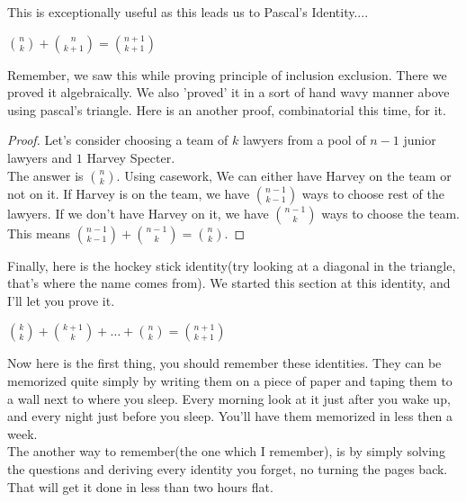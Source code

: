 This is exceptionally useful as this leads us to Pascal's Identity....
\begin{theorem}
    $\binom{n}{k} + \binom{n}{k+1}=\binom{n+1}{k+1}$
\end{theorem}
Remember, we saw this while proving principle of inclusion exclusion. There we proved it algebraically. We also 'proved' it in a sort of hand wavy manner above using pascal's triangle. Here is an another proof, combinatorial this time, for it.\\
\begin{proof}
    Let's consider choosing a team of $k$ lawyers from a pool of $n-1$ junior lawyers and $1$ Harvey Specter.\\
    The answer is $\binom{n}{k}$. Using casework, We can either have Harvey on the team or not on it. If Harvey is on the team, we have $\binom{n-1}{k-1}$ ways to choose rest of the lawyers. If we don't have Harvey on it, we have $\binom{n-1}{k}$ ways to choose the team.\\
    This means $\binom{n-1}{k-1}+\binom{n-1}{k}=\binom{n}{k}$.
\end{proof}
Finally, here is the hockey stick identity(try looking at a diagonal in the triangle, that's where the name comes from). We started this section at this identity, and I'll let you prove it.\\
\begin{theorem}
    $\binom{k}{k}+\binom{k+1}{k}+ \dots +\binom{n}{k}=\binom{n+1}{k+1}$
\end{theorem}
Now here is the first thing, you should remember these identities. They can be memorized quite simply by writing them on a piece of paper and taping them to a wall next to where you sleep. Every morning look at it just after you wake up, and every night just before you sleep. You'll have them memorized in less then a week.\\
The another way to remember(the one which I remember), is by simply solving the questions and deriving every identity you forget, no turning the pages back. That will get it done in less than two hours flat.\\
